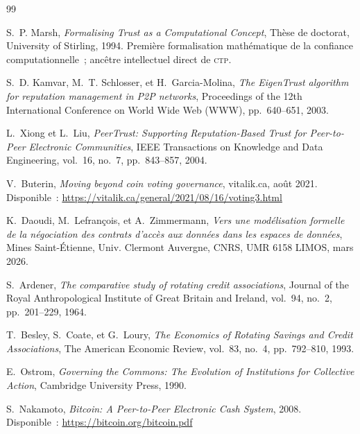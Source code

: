 \documentclass[12pt,a4paper]{article}
\theoremstyle{definition}
\theoremstyle{plain}
\theoremstyle{remark}
\newcommand{\CTP}{\textsc{ctp}}
\newcommand{\1}{\mathbf{1}}
\begin{document}
\begin{thebibliography}{99}

S.~P. Marsh,
\textit{Formalising Trust as a Computational Concept},
Thèse de doctorat, University of Stirling, 1994.
Première formalisation mathématique de la confiance computationnelle~;
ancêtre intellectuel direct de \CTP{}.

S.~D. Kamvar, M.~T. Schlosser, et H.~Garcia-Molina,
\textit{The EigenTrust algorithm for reputation management in P2P networks},
Proceedings of the 12th International Conference on World Wide Web (WWW),
pp.~640--651, 2003.

L.~Xiong et L.~Liu,
\textit{PeerTrust: Supporting Reputation-Based Trust for Peer-to-Peer Electronic Communities},
IEEE Transactions on Knowledge and Data Engineering,
vol.~16, no.~7, pp.~843--857, 2004.

V.~Buterin,
\textit{Moving beyond coin voting governance},
vitalik.ca, août 2021.
Disponible~: \url{https://vitalik.ca/general/2021/08/16/voting3.html}

K.~Daoudi, M.~Lefrançois, et A.~Zimmermann,
\textit{Vers une modélisation formelle de la négociation des contrats d'accès
aux données dans les espaces de données},
Mines Saint-Étienne, Univ. Clermont Auvergne, CNRS, UMR 6158 LIMOS,
mars 2026.

S.~Ardener,
\textit{The comparative study of rotating credit associations},
Journal of the Royal Anthropological Institute of Great Britain and Ireland,
vol.~94, no.~2, pp.~201--229, 1964.

T.~Besley, S.~Coate, et G.~Loury,
\textit{The Economics of Rotating Savings and Credit Associations},
The American Economic Review,
vol.~83, no.~4, pp.~792--810, 1993.

E.~Ostrom,
\textit{Governing the Commons: The Evolution of Institutions for Collective Action},
Cambridge University Press, 1990.

S.~Nakamoto,
\textit{Bitcoin: A Peer-to-Peer Electronic Cash System},
2008.
Disponible~: \url{https://bitcoin.org/bitcoin.pdf}

\end{thebibliography}
\end{document}
